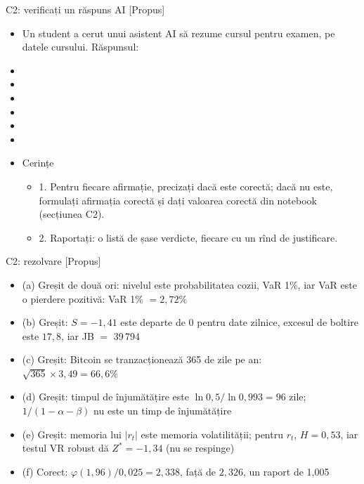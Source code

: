 \begin{frame}{C2: verificați un răspuns AI [Propus]}
\itemsize{\scriptsize}
\begin{itemize}
    \item Un student a cerut unui asistent AI să rezume cursul pentru examen, pe datele cursului. Răspunsul:
    \item {}
    \item {}
    \item {}
    \item {}
    \item {}
    \item {}
    \item Cerințe
    \begin{itemize}
        \item 1. Pentru fiecare afirmație, precizați dacă este corectă; dacă nu este, formulați afirmația corectă și dați valoarea corectă din notebook (secțiunea C2).
        \item 2. Raportați: o listă de șase verdicte, fiecare cu un rînd de justificare.
    \end{itemize}
\end{itemize}
\end{frame}

\ifsolutions
\begin{frame}{C2: rezolvare [Propus]}
\itemsize{\footnotesize}
\begin{itemize}
    \item (a) Greșit de două ori: nivelul este probabilitatea cozii, VaR 1\%, iar VaR este o pierdere pozitivă: VaR 1\% $= 2{,}72\%$
    \item (b) Greșit: $S = -1{,}41$ este departe de 0 pentru date zilnice, excesul de boltire este $17{,}8$, iar JB $=$ 39\,794
    \item (c) Greșit: Bitcoin se tranzacționează 365 de zile pe an: $\sqrt{365} \times 3{,}49 = 66{,}6\%$
    \item (d) Greșit: timpul de înjumătățire este $\ln 0{,}5/\ln 0{,}993 = 96$ zile; $1/(1 - \alpha - \beta)$ nu este un timp de înjumătățire
    \item (e) Greșit: memoria lui $|r_t|$ este memoria volatilității; pentru $r_t$, $H = 0{,}53$, iar testul VR robust dă $Z^* = -1{,}34$ (nu se respinge)
    \item (f) Corect: $\varphi(1{,}96)/0{,}025 = 2{,}338$, față de $2{,}326$, un raport de 1{,}005
\end{itemize}
\end{frame}
\fi



